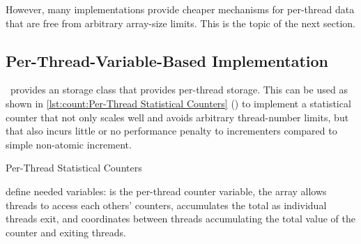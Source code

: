 \QuickQuizLabel{\StatisticalCounterAccuracy}

However, many implementations provide cheaper mechanisms for
per-thread data that are free from arbitrary array-size limits.
This is the topic of the next section.

\subsection{Per-Thread-Variable-Based Implementation}
\label{sec:count:Per-Thread-Variable-Based Implementation}

\GCC\ provides an  storage class that provides
per-thread storage.
This can be used as shown in
\cref{lst:count:Per-Thread Statistical Counters} ()
to implement
a statistical counter that not only scales well and avoids arbitrary
thread-number limits, but that also incurs little or no performance
penalty to incrementers compared to simple non-atomic increment.

\begin{listing}

\caption{Per-Thread Statistical Counters}
\label{lst:count:Per-Thread Statistical Counters}
\end{listing}

\begin{fcvref}
 define needed variables:
 is the per-thread counter
variable, the  array allows threads to access each others'
counters,  accumulates the total as individual threads exit,
and  coordinates between threads accumulating the total
value of the counter and exiting threads.
\end{fcvref}

